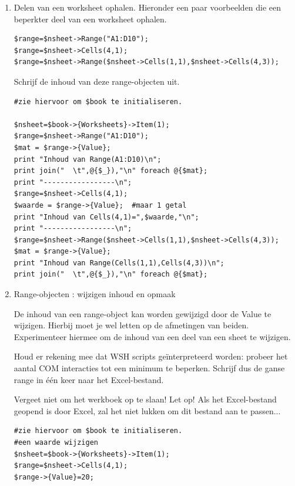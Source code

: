 \documentclass[11pt,a4paper]{report}
\begin{document}
\begin{enumerate}[resume]
\begin{lstlisting}
foreach $nsheet (in $book->{Worksheets}){
	print "\n$nsheet->{name}\n";
	$range=$nsheet->{UsedRange};
	$mat = $range->{Value};
	if (ref $mat) {   #controleren op leeg werkblad
		print "matrix met $range->{rows}->{Count} rijen en $range->{columns}->{Count} kolommen\n";
		print join("  \t",@{$_}),"\n" foreach @{$mat};
	}
	else {
		($mat ? print "1 inhoud : $mat\n": print "leeg werkblad\n");
	}
	print "\n-----------------------------------------\n";
}
\end{lstlisting}
	\item Delen van een worksheet ophalen. Hieronder een paar voorbeelden die een beperkter deel van een worksheet ophalen.
\begin{lstlisting}
$range=$nsheet->Range("A1:D10");
$range=$nsheet->Cells(4,1);
$range=$nsheet->Range($nsheet->Cells(1,1),$nsheet->Cells(4,3));
\end{lstlisting}
	Schrijf de inhoud van deze range-objecten uit.
\begin{lstlisting}
#zie hiervoor om $book te initialiseren.

$nsheet=$book->{Worksheets}->Item(1);
$range=$nsheet->Range("A1:D10");
$mat = $range->{Value};
print "Inhoud van Range(A1:D10)\n";
print join("  \t",@{$_}),"\n" foreach @{$mat};
print "-----------------\n";
$range=$nsheet->Cells(4,1);
$waarde = $range->{Value};  #maar 1 getal
print "Inhoud van Cells(4,1)=",$waarde,"\n";
print "-----------------\n";
$range=$nsheet->Range($nsheet->Cells(1,1),$nsheet->Cells(4,3));
$mat = $range->{Value};
print "Inhoud van Range(Cells(1,1),Cells(4,3))\n";
print join("  \t",@{$_}),"\n" foreach @{$mat};
\end{lstlisting}
	\item Range-objecten : wijzigen inhoud en opmaak
	\par De inhoud van een range-object kan worden gewijzigd door de Value te wijzigen. Hierbij moet je wel letten op de afmetingen van beiden. Experimenteer hiermee om de inhoud van een deel van een sheet te wijzigen.
	\par Houd er rekening mee dat WSH scripts geïnterpreteerd worden: probeer het aantal COM interacties tot een minimum te beperken. Schrijf dus de ganse range in één keer naar het Excel-bestand.
	\par Vergeet niet om het werkboek op te slaan! Let op! Als het Excel-bestand geopend is door Excel, zal het niet lukken om dit bestand aan te passen...
\begin{lstlisting}
#zie hiervoor om $book te initialiseren.
#een waarde wijzigen
$nsheet=$book->{Worksheets}->Item(1);
$range=$nsheet->Cells(4,1);
$range->{Value}=20;


\end{lstlisting}
\end{enumerate}
\end{document}
